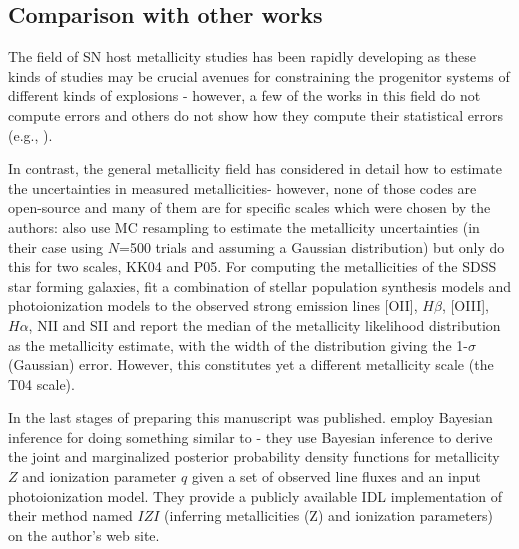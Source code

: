 \documentclass{emulateapj}
\begin{document}
\subsection{Comparison with other works}



The field of SN host metallicity studies has been rapidly developing as these kinds of studies may be crucial avenues for constraining the progenitor systems of different kinds of explosions - however, a few of the works in this field do not compute errors and others do not show how they compute their statistical errors  (e.g., \citealt{anderson10,leloudas11,sanders12,leloudas14}). %

In contrast, the general metallicity field has considered in detail how to estimate the uncertainties in measured metallicities- however, none of those codes are open-source and many of them are for specific scales which were chosen by the authors:  \citet{moustakas10} also use MC resampling to estimate the metallicity uncertainties (in their case using $N$=500 trials and assuming a Gaussian distribution) but only do this for two scales, KK04 and P05. For computing the metallicities of the SDSS star forming galaxies, \citet{tremonti04} fit a combination of stellar population synthesis models and  photoionization models to the observed strong emission lines [OII], $H\beta$, [OIII], $H\alpha$, NII and SII and report the median of the metallicity likelihood distribution as the metallicity estimate, with the width of the distribution giving the 1-$\sigma$ (Gaussian) error. However, this constitutes yet a different metallicity scale (the T04 scale).

In the last stages of preparing this manuscript \citet{blanc15} was published.  \citet{blanc15} employ Bayesian inference for doing something similar to \citet{tremonti04} - they use Bayesian inference to derive the joint and marginalized posterior probability density functions for metallicity $Z$ and ionization parameter $q$ given a set of observed line fluxes and an input photoionization model. They provide a publicly available IDL implementation of their method named $IZI$ (inferring metallicities (Z) and ionization parameters) on the author's web site.
\end{document}
